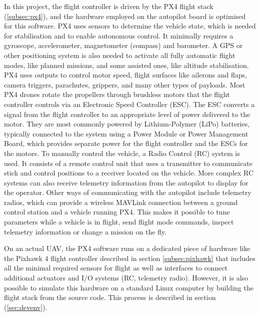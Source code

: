 In this project, the flight controller is driven by the PX4 flight stack (\ref{subsec:px4}), and the hardware employed on the autopilot board is optimised for this software.
PX4 uses sensors to determine the vehicle state, which is needed for stabilisation and to enable autonomous control.
It minimally requires a gyroscope, accelerometer, magnetometer (compass) and barometer.
A GPS or other positioning system is also needed to activate all fully automatic flight modes, like planned missions, and some assisted ones, like altitude stabilisation.
PX4 uses outputs to control motor speed, flight surfaces like ailerons and flaps, camera triggers, parachutes, grippers, and many other types of payloads.
Most PX4 drones rotate the propellers through brushless motors that the flight controller controls via an Electronic Speed Controller (ESC).
The ESC converts a signal from the flight controller to an appropriate level of power delivered to the motor.
They are most commonly powered by Lithium-Polymer (LiPo) batteries, typically connected to the system using a Power Module or Power Management Board, 
which provides separate power for the flight controller and the ESCs for the motors.
To manually control the vehicle, a Radio Control (RC) system is used.
It consists of a remote control unit that uses a transmitter to communicate stick and control positions to a receiver located on the vehicle.
More complex RC systems can also receive telemetry information from the autopilot to display for the operator.
Other ways of communicating with the autopilot include telemetry radios, which can provide a wireless MAVLink connection between a ground control station and a vehicle running PX4.
This makes it possible to tune parameters while a vehicle is in flight, send flight mode commands, inspect telemetry information or change a mission on the fly.

On an actual UAV, the PX4 software runs on a dedicated piece of hardware like the Pixhawk 4 flight controller described in section \ref{subsec:pixhawk} that includes all the minimal required sensors for flight as well as interfaces to connect additional actuators and I/O systems (RC, telemetry radio).
However, it is also possible to simulate this hardware on a standard Linux computer by building the flight stack from the source code.
This process is described in section (\ref{sec:devenv}).

